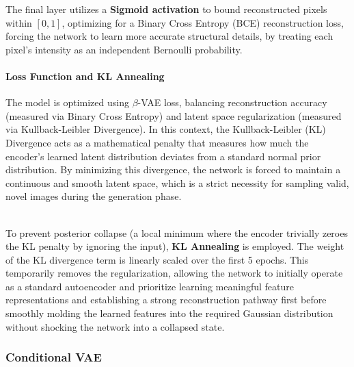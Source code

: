 \documentclass[runningheads]{llncs}
\begin{document}
\noindent
The final layer utilizes a \textbf{Sigmoid activation} to bound reconstructed pixels within $[0, 1]$, optimizing for a Binary Cross Entropy (BCE) reconstruction loss, forcing the network to learn more accurate structural details, by treating each pixel’s intensity as an independent Bernoulli probability.


\paragraph{\normalfont\textbf{Loss Function and KL Annealing}}
The model is optimized using $\beta$-VAE loss, balancing reconstruction accuracy (measured via Binary Cross Entropy) and latent space regularization (measured via Kullback-Leibler Divergence). In this context, the Kullback-Leibler (KL) Divergence acts as a mathematical penalty that measures how much the encoder's learned latent distribution deviates from a standard normal prior distribution. By minimizing this divergence, the network is forced to maintain a continuous and smooth latent space, which is a strict necessity for sampling valid, novel images during the generation phase.





\noindent
\\
To prevent posterior collapse (a local minimum where the encoder trivially zeroes the KL penalty by ignoring the input), \textbf{KL Annealing} is employed. The weight of the KL divergence term is linearly scaled over the first 5 epochs. This temporarily removes the regularization, allowing the network to initially operate as a standard autoencoder and prioritize learning meaningful feature representations and establishing a strong reconstruction pathway first before smoothly molding the learned features into the required Gaussian distribution without shocking the network into a collapsed state.

\subsubsection{Conditional VAE}
\end{document}
